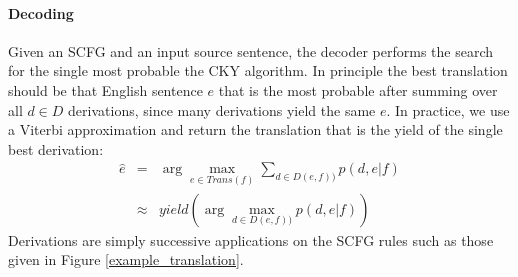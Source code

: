 \documentclass[11pt]{article}
\begin{document}
\paragraph{Decoding}

Given an SCFG and an input source sentence, the decoder performs the
search for the single most probable the CKY algorithm.  In principle
the best translation should be that English sentence $e$ that is the
most probable after summing over all $d\in D$ derivations, since many
derivations yield the same $e$.  In practice, we use a Viterbi
approximation and return the translation that is the yield of the
single best derivation:
\begin{eqnarray}
  \hat{e} &=& \arg \max_{e\in Trans(f)} \sum_{d\in D(e,f))}{p(d,e|f)}\\
             &\approx& yield(\arg \max_{d\in D(e,f))}{p(d,e|f)})
\end{eqnarray}
Derivations are simply successive applications on the SCFG rules such
as those given in Figure \ref{example_translation}.
\end{document}
